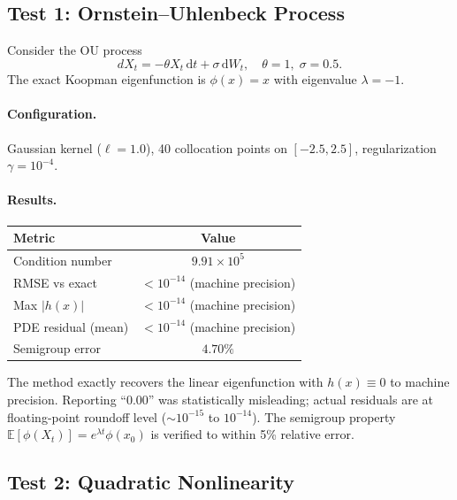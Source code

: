 \documentclass[11pt,a4paper]{article}
\newcommand{\E}{\mathbb{E}}
\newcommand{\dt}{\,\mathrm{d}t}
\newcommand{\dW}{\,\mathrm{d}W}
\begin{document}
\subsection{Test 1: Ornstein--Uhlenbeck Process}

Consider the OU process
\begin{equation}
    dX_t = -\theta X_t\dt + \sigma\dW_t, \quad \theta=1,\; \sigma=0.5.
\end{equation}
The exact Koopman eigenfunction is $\phi(x) = x$ with eigenvalue $\lambda = -1$.

\paragraph{Configuration.} Gaussian kernel ($\ell=1.0$), 40 collocation points on $[-2.5, 2.5]$, regularization $\gamma=10^{-4}$.

\paragraph{Results.}
\begin{center}
\begin{tabular}{lc}
\toprule
Metric & Value \\
\midrule
Condition number & $9.91 \times 10^{5}$ \\
RMSE vs exact & $< 10^{-14}$ (machine precision) \\
Max $|h(x)|$ & $< 10^{-14}$ (machine precision) \\
PDE residual (mean) & $< 10^{-14}$ (machine precision) \\
Semigroup error & $4.70\%$ \\
\bottomrule
\end{tabular}
\end{center}

The method exactly recovers the linear eigenfunction with $h(x)\equiv 0$ to machine precision. Reporting ``$0.00$'' was statistically misleading; actual residuals are at floating-point roundoff level ($\sim 10^{-15}$ to $10^{-14}$). The semigroup property $\E[\phi(X_t)] = e^{\lambda t}\phi(x_0)$ is verified to within 5\% relative error.

\subsection{Test 2: Quadratic Nonlinearity}
\end{document}
